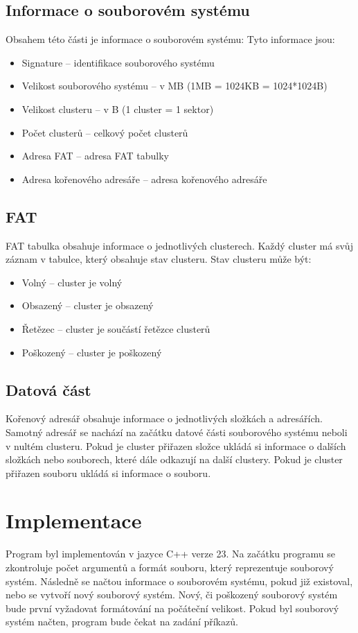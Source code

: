 \documentclass[12pt, a4paper]{article}
\begin{document}
\subsection{Informace o souborovém systému}
Obsahem této části je informace o souborovém systému:
Tyto informace jsou:
\begin{itemize}
    \item Signature -- identifikace souborového systému
    \item Velikost souborového systému -- v MB (1MB = 1024KB = 1024*1024B)
    \item Velikost clusteru -- v B (1 cluster = 1 sektor)
    \item Počet clusterů -- celkový počet clusterů
    \item Adresa FAT -- adresa FAT tabulky
    \item Adresa kořenového adresáře -- adresa kořenového adresáře
\end{itemize}

\subsection{FAT}
FAT tabulka obsahuje informace o jednotlivých clusterech.
Každý cluster má svůj záznam v tabulce, který obsahuje stav clusteru.
Stav clusteru může být:
\begin{itemize}
    \item Volný -- cluster je volný
    \item Obsazený -- cluster je obsazený
    \item Řetězec -- cluster je součástí řetězce clusterů
    \item Poškozený -- cluster je poškozený
\end{itemize}

\subsection{Datová část}
Kořenový adresář obsahuje informace o jednotlivých složkách a adresářích.
Samotný adresář se nachází na začátku datové části souborového systému neboli v nultém clusteru.
Pokud je cluster přiřazen složce ukládá si informace o dalších složkách nebo souborech, které dále odkazují na další clustery.
Pokud je cluster přiřazen souboru ukládá si informace o souboru.

\section{Implementace}
Program byl implementován v jazyce C++ verze 23.
Na začátku programu se zkontroluje počet argumentů a formát souboru, který reprezentuje souborový systém.
Následně se načtou informace o souborovém systému, pokud již existoval, nebo se vytvoří nový souborový systém.
Nový, či poškozený souborový systém bude první vyžadovat formátování na počáteční velikost.
Pokud byl souborový systém načten, program bude čekat na zadání příkazů.
\end{document}
